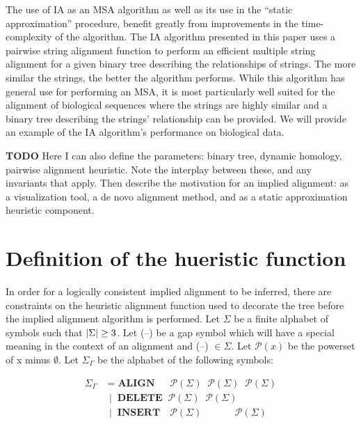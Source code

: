 \documentclass[11pt]{article}
\DeclarePairedDelimiter\setsize{\lvert}{\rvert}%
\begin{document}
The use of IA as an MSA algorithm as well as its use in the ``static approximation'' procedure, benefit greatly from improvements in the time-complexity of the algorithm.
The IA algorithm presented in this paper uses a pairwise string alignment function to perform an efficient multiple string alignment for a given binary tree describing the relationships of strings. 
The more similar the strings, the better the algorithm performs. 
While this algorithm has general use for performing an MSA, it is most particularly well suited for the alignment of biological sequences where the strings are highly similar and a binary tree describing the strings' relationship can be provided. 
We will provide an example of the IA algorithm's performance on biological data.

\textbf{TODO}
Here I can also define the parameters: binary tree, dynamic homology, pairwise alignment heuristic. Note the interplay between these, and any invariants that apply. Then describe the motivation for an implied alignment: as a visualization tool, a de novo alignment method, and as a static approximation heuristic component.

\section{Definition of the hueristic function}
In order for a logically consistent implied alignment to be inferred, there are constraints on the heuristic alignment function used to decorate the tree before the implied alignment algorithm is performed.
Let $\Sigma$ be a finite alphabet of symbols such that $\setsize{\Sigma} \geq 3$.
Let (--) be a gap symbol which will have a special meaning in the context of an alignment and (--) $\in \Sigma$.
Let $\mathcal{P}(x)$ be the powerset of x minus $\emptyset$.
Let $\Sigma_{\Gamma}$ be the alphabet of the following symbols:

\begin{align*}
  \Sigma_{\Gamma} &      = \textbf{ALIGN}  \;\;\;\;\;\,  \mathcal{P} (\Sigma) \;\; \mathcal{P} (\Sigma) \;\; \mathcal{P} (\Sigma)
\\                & \;\, | \;\; \textbf{DELETE} \;\;     \mathcal{P} (\Sigma) \;\; \mathcal{P} (\Sigma)
\\                & \;\, | \;\; \textbf{INSERT} \;\;\;\, \mathcal{P} (\Sigma) \;\; \quad\quad\;         \;\; \mathcal{P} (\Sigma)
\end{align*}
\end{document}

